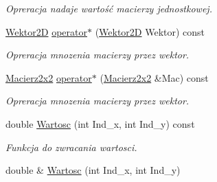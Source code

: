 \begin{DoxyCompactItemize}
\begin{DoxyCompactList}\small\item\em Opreracja nadaje wartość macierzy jednostkowej. \end{DoxyCompactList}\item 
\hypertarget{class_macierz2x2_a8e8e7bc27849974c083ad430608d57ea}{\hyperlink{class_wektor2_d}{Wektor2\+D} \hyperlink{class_macierz2x2_a8e8e7bc27849974c083ad430608d57ea}{operator$\ast$} (\hyperlink{class_wektor2_d}{Wektor2\+D} Wektor) const }\label{class_macierz2x2_a8e8e7bc27849974c083ad430608d57ea}

\begin{DoxyCompactList}\small\item\em Opreracja mnozenia macierzy przez wektor. \end{DoxyCompactList}\item 
\hypertarget{class_macierz2x2_a9e7656a5a09eb64be4c2fd69de006705}{\hyperlink{class_macierz2x2}{Macierz2x2} \hyperlink{class_macierz2x2_a9e7656a5a09eb64be4c2fd69de006705}{operator$\ast$} (\hyperlink{class_macierz2x2}{Macierz2x2} \&Mac) const }\label{class_macierz2x2_a9e7656a5a09eb64be4c2fd69de006705}

\begin{DoxyCompactList}\small\item\em Opreracja mnozenia macierzy przez wektor. \end{DoxyCompactList}\item 
\hypertarget{class_macierz2x2_a728b95a82bbc553d8db4f2e40ac41801}{double \hyperlink{class_macierz2x2_a728b95a82bbc553d8db4f2e40ac41801}{Wartosc} (int Ind\+\_\+x, int Ind\+\_\+y) const }\label{class_macierz2x2_a728b95a82bbc553d8db4f2e40ac41801}

\begin{DoxyCompactList}\small\item\em Funkcja do zwracania wartosci. \end{DoxyCompactList}\item 
\hypertarget{class_macierz2x2_a38ca07afa6556b6b7e10f851359f7124}{double \& \hyperlink{class_macierz2x2_a38ca07afa6556b6b7e10f851359f7124}{Wartosc} (int Ind\+\_\+x, int Ind\+\_\+y)}\label{class_macierz2x2_a38ca07afa6556b6b7e10f851359f7124}


\end{DoxyCompactItemize}
